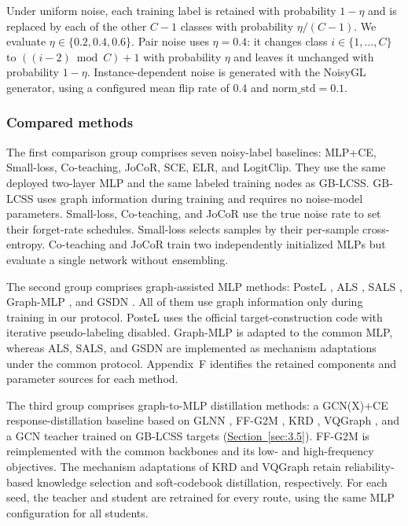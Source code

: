 \documentclass[a4paper,fleqn]{cas-sc}
\theoremstyle{definition}
\theoremstyle{plain}
\begin{document}
Under uniform noise, each training label is retained with probability \(1-\eta\) and is replaced by each of the other \(C-1\) classes with probability \(\eta/(C-1)\). We evaluate \(\eta\in\{0.2,0.4,0.6\}\). Pair noise uses \(\eta=0.4\): it changes class \(i\in\{1,\ldots,C\}\) to \(((i-2)\bmod C)+1\) with probability \(\eta\) and leaves it unchanged with probability \(1-\eta\). Instance-dependent noise is generated with the NoisyGL generator, using a configured mean flip rate of 0.4 and \(\text{norm\_std}=0.1\).

\subsubsection{Compared methods}\label{sec:4.1.3}

The first comparison group comprises seven noisy-label baselines: MLP+CE, Small-loss, Co-teaching, JoCoR, SCE, ELR, and LogitClip. They use the same deployed two-layer MLP and the same labeled training nodes as GB-LCSS. GB-LCSS uses graph information during training and requires no noise-model parameters. Small-loss, Co-teaching, and JoCoR use the true noise rate to set their forget-rate schedules. Small-loss selects samples by their per-sample cross-entropy. Co-teaching and JoCoR train two independently initialized MLPs but evaluate a single network without ensembling.

The second group comprises graph-assisted MLP methods: PosteL \cite{ref54}, ALS \cite{ref55}, SALS \cite{ref56}, Graph-MLP \cite{ref3}, and GSDN \cite{ref40}. All of them use graph information only during training in our protocol. PosteL uses the official target-construction code with iterative pseudo-labeling disabled. Graph-MLP is adapted to the common MLP, whereas ALS, SALS, and GSDN are implemented as mechanism adaptations under the common protocol. Appendix~F identifies the retained components and parameter sources for each method.

The third group comprises graph-to-MLP distillation methods: a GCN(X)+CE response-distillation baseline based on GLNN \cite{ref4}, FF-G2M \cite{ref45}, KRD \cite{ref46}, VQGraph \cite{ref47}, and a GCN teacher trained on GB-LCSS targets (\hyperref[sec:3.5]{Section~\ref*{sec:3.5}}). FF-G2M is reimplemented with the common backbones and its low- and high-frequency objectives. The mechanism adaptations of KRD and VQGraph retain reliability-based knowledge selection and soft-codebook distillation, respectively. For each seed, the teacher and student are retrained for every route, using the same MLP configuration for all students.
\end{document}
